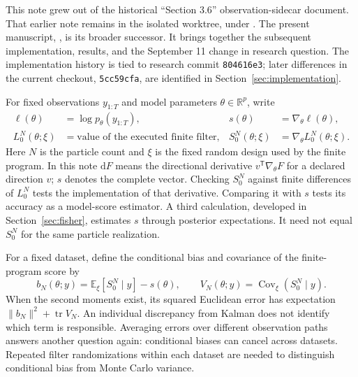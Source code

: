 \documentclass[11pt]{article}
\newcommand{\R}{\mathbb{R}}
\newcommand{\dd}{\mathrm{d}}
\begin{document}
This note grew out of the historical ``Section 3.6'' observation-sidecar
document. That earlier note remains in the isolated
 worktree, under
. The present manuscript,
, is its
broader successor. It brings together the subsequent implementation, results,
and the September 11 change in research question. The implementation history
is tied to research commit \texttt{804616e3}; later differences in the current
checkout, \texttt{5cc59cfa}, are identified in Section~\ref{sec:implementation}.

For fixed observations $y_{1:T}$ and model parameters $\theta\in\R^p$, write
\begin{align}
 \ell(\theta)&=\log p_\theta(y_{1:T}), &
 s(\theta)&=\nabla_\theta\ell(\theta), \label{eq:exact-score}\\
 L_0^N(\theta;\xi)&=\text{value of the executed finite filter}, &
 S_0^N(\theta;\xi)&=\nabla_\theta L_0^N(\theta;\xi).
 \label{eq:finite-score}
\end{align}
Here $N$ is the particle count and $\xi$ is the fixed random design used by
the finite program. In this note $\dd F$ means the directional derivative
$v^\mathsf{T}\nabla_\theta F$ for a declared direction $v$; $s$ denotes the
complete vector. Checking $S_0^N$ against finite differences of $L_0^N$ tests
the implementation of that derivative. Comparing it with $s$ tests its
accuracy as a model-score estimator. A third calculation, developed in
Section~\ref{sec:fisher}, estimates $s$ through posterior expectations. It
need not equal $S_0^N$ for the same particle realization.

For a fixed dataset, define the conditional bias and covariance of the
finite-program score by
\begin{equation}
 b_N(\theta;y)=\mathbb E_\xi[S_0^N\mid y]-s(\theta),\qquad
 V_N(\theta;y)=\operatorname{Cov}_\xi(S_0^N\mid y).
 \label{eq:conditional-score-error}
\end{equation}
When the second moments exist, its squared Euclidean error has expectation
$\|b_N\|^2+\operatorname{tr}V_N$. An individual discrepancy from Kalman does
not identify which term is responsible. Averaging errors over different
observation paths answers another question again: conditional biases can
cancel across datasets. Repeated filter randomizations within each dataset
are needed to distinguish conditional bias from Monte Carlo variance.
\end{document}
